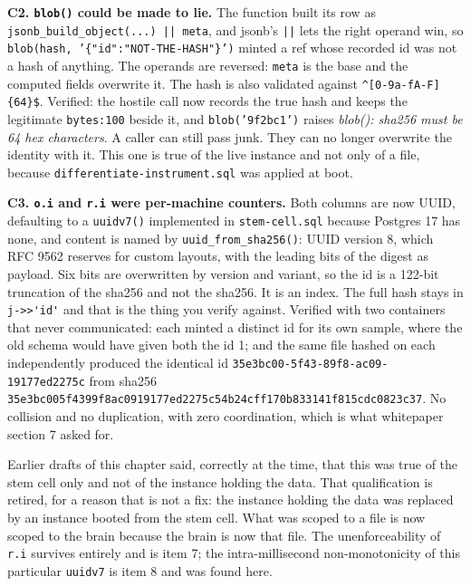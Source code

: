 \textbf{C2. \texttt{blob()} could be made to lie.} The function built its row as \texttt{jsonb\_build\_object(...) || meta}, and jsonb's \texttt{||} lets the right operand win, so \texttt{blob(hash, '\{"id":"NOT-THE-HASH"\}')} minted a ref whose recorded id was not a hash of anything. The operands are reversed: \texttt{meta} is the base and the computed fields overwrite it. The hash is also validated against \verb|^[0-9a-fA-F]{64}$|. Verified: the hostile call now records the true hash and keeps the legitimate \texttt{bytes:100} beside it, and \texttt{blob('9f2bc1')} raises \textit{blob(): sha256 must be 64 hex characters}. A caller can still pass junk. They can no longer overwrite the identity with it. This one is true of the live instance and not only of a file, because \texttt{differentiate-instrument.sql} was applied at boot.

\textbf{C3. \texttt{o.i} and \texttt{r.i} were per-machine counters.} Both columns are now UUID, defaulting to a \texttt{uuidv7()} implemented in \texttt{stem-cell.sql} because Postgres 17 has none, and content is named by \texttt{uuid\_from\_sha256()}: UUID version 8, which RFC 9562 reserves for custom layouts, with the leading bits of the digest as payload. Six bits are overwritten by version and variant, so the id is a 122-bit truncation of the sha256 and not the sha256. It is an index. The full hash stays in \verb|j->>'id'| and that is the thing you verify against. Verified with two containers that never communicated: each minted a distinct id for its own sample, where the old schema would have given both the id 1; and the same file hashed on each independently produced the identical id \texttt{35e3bc00-5f43-89f8-ac09-19177ed2275c} from sha256 \texttt{35e3bc00\allowbreak5f4399f8\allowbreak ac091917\allowbreak 7ed2275c\allowbreak 54b24cff\allowbreak 170b8331\allowbreak 41f815cd\allowbreak c0823c37}. No collision and no duplication, with zero coordination, which is what whitepaper section 7 asked for.

Earlier drafts of this chapter said, correctly at the time, that this was true of the stem cell only and not of the instance holding the data. That qualification is retired, for a reason that is not a fix: the instance holding the data was replaced by an instance booted from the stem cell. What was scoped to a file is now scoped to the brain because the brain is now that file. The unenforceability of \texttt{r.i} survives entirely and is item 7; the intra-millisecond non-monotonicity of this particular \texttt{uuidv7} is item 8 and was found here.

